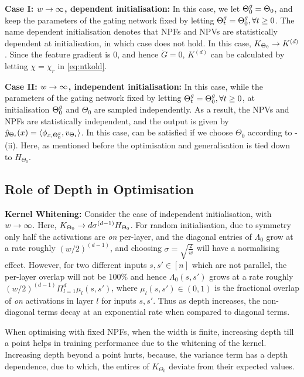 \textbf{Case I: $w\rightarrow\infty$, dependent initialisation:} In this case, we let ${\Theta}^g_0=\Theta_0$, and keep the parameters of the gating network fixed by letting ${\Theta}^g_t={\Theta}^g_0,\forall t\geq 0$. The name dependent initialisation denotes that NPFs and NPVs are statistically dependent at initialisation, in which case  does not hold. In this case, $K_{\Theta_0}\rightarrow K^{(d)}$. Since the feature gradient is $0$, and hence $\dot{G}=0$, $K^{(d)}$ can be calculated by letting $\chi=\chi_{r}$ in \eqref{eq:ntkold}.

\textbf{Case II: $w\rightarrow\infty$, independent initialisation:} In this case, while the parameters of the gating network fixed by letting ${\Theta}^g_t={\Theta}^g_0,\forall t\geq 0$, at initialisation ${\Theta}^g_0$ and $\Theta_0$ are sampled independently. As a result, the NPVs and NPFs are statistically independent, and the output is given by $\hat{y}_{\Theta_t}(x)=\langle \phi_{x,{\Theta}^g_0},v_{\Theta_t}\rangle$. In this case,  can be satisfied if we choose $\Theta_0$ according to -(ii). Here, as mentioned before the optimisation and generalisation is tied down to $H_{\Theta_0}$. 
\subsection{Role of Depth in Optimisation}
\textbf{Kernel Whitening:} Consider the case of independent initialisation, with $w\rightarrow\infty$. Here, $K_{\Theta_0}\rightarrow d\sigma^{(d-1)}H_{\Theta_0}$. For random initialisation, due to symmetry only half the activations are \emph{on} per-layer, and the diagonal entries of $\Lambda_0$ grow at a rate roughly $(w/2)^{(d-1)}$, and choosing $\sigma=\sqrt{\frac{2}w}$ will have a normalising effect. However, for two different inputs $s,s'\in[n]$ which are not parallel, the per-layer overlap will not be $100\%$ and hence $\Lambda_0(s,s')$ grows at a rate roughly $(w/2)^{(d-1)}\Pi_{l=1}^d \mu_l(s,s')$, where $\mu_{l}(s,s')\in(0,1)$ is the fractional overlap of \emph{on} activations in layer $l$ for inputs $s,s'$. Thus as depth increases, the non-diagonal terms decay at an exponential rate when compared to diagonal terms.

When optimising with fixed NPFs, when the width is finite, increasing depth till a point helps in training performance due to the whitening of the kernel. Increasing depth beyond a point hurts, because, the variance term has a depth dependence, due to which, the entires of $K_{\Theta_0}$ deviate from their expected values.


